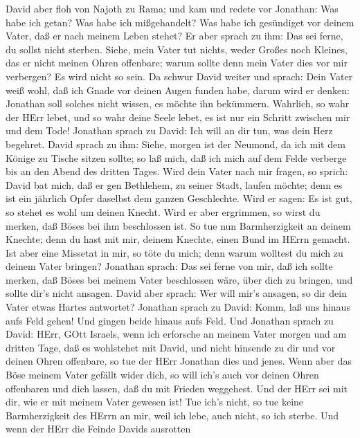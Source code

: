  David aber floh von Najoth zu Rama; und kam und redete vor
Jonathan: Was habe ich getan? Was habe ich mißgehandelt? Was habe ich
gesündiget vor deinem Vater, daß er nach meinem Leben stehet?
 Er aber sprach zu ihm: Das sei ferne, du sollst nicht
sterben. Siehe, mein Vater tut nichts, weder Großes noch Kleines, das er
nicht meinen Ohren offenbare; warum sollte denn mein Vater dies vor mir
verbergen? Es wird nicht so sein.  Da schwur David weiter
und sprach: Dein Vater weiß wohl, daß ich Gnade vor deinen Augen funden
habe, darum wird er denken: Jonathan soll solches nicht wissen, es
möchte ihn bekümmern. Wahrlich, so wahr der HErr lebet, und so wahr
deine Seele lebet, es ist nur ein Schritt zwischen mir und dem Tode!
 Jonathan sprach zu David: Ich will an dir tun, was dein
Herz begehret.  David sprach zu ihm: Siehe, morgen ist der
Neumond, da ich mit dem Könige zu Tische sitzen sollte; so laß mich, daß
ich mich auf dem Felde verberge bis an den Abend des dritten Tages.
 Wird dein Vater nach mir fragen, so sprich: David bat mich,
daß er gen Bethlehem, zu seiner Stadt, laufen möchte; denn es ist ein
jährlich Opfer daselbst dem ganzen Geschlechte.  Wird er
sagen: Es ist gut, so stehet es wohl um deinen Knecht. Wird er aber
ergrimmen, so wirst du merken, daß Böses bei ihm beschlossen ist.
 So tue nun Barmherzigkeit an deinem Knechte; denn du hast
mit mir, deinem Knechte, einen Bund im HErrn gemacht. Ist aber eine
Missetat in mir, so töte du mich; denn warum wolltest du mich zu deinem
Vater bringen?  Jonathan sprach: Das sei ferne von mir, daß
ich sollte merken, daß Böses bei meinem Vater beschlossen wäre, über
dich zu bringen, und sollte dir's nicht ansagen.  David
aber sprach: Wer will mir's ansagen, so dir dein Vater etwas Hartes
antwortet?  Jonathan sprach zu David: Komm, laß uns hinaus
aufs Feld gehen! Und gingen beide hinaus aufs Feld.  Und
Jonathan sprach zu David: HErr, GOtt Israels, wenn ich erforsche an
meinem Vater morgen und am dritten Tage, daß es wohlstehet mit David,
und nicht hinsende zu dir und vor deinen Ohren offenbare, 
so tue der HErr Jonathan dies und jenes. Wenn aber das Böse meinem Vater
gefällt wider dich, so will ich's auch vor deinen Ohren offenbaren und
dich lassen, daß du mit Frieden weggehest. Und der HErr sei mit dir, wie
er mit meinem Vater gewesen ist!  Tue ich's nicht, so tue
keine Barmherzigkeit des HErrn an mir, weil ich lebe, auch nicht, so ich
sterbe.  Und wenn der HErr die Feinde Davids ausrotten
